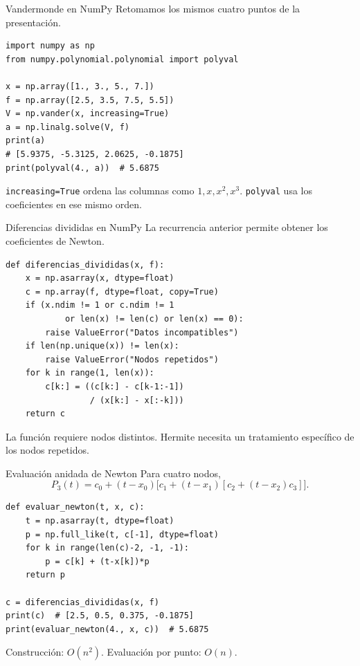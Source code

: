 \documentclass[aspectratio=169,12pt]{beamer}
\theoremstyle{remark}
\begin{document}
\begin{frame}[fragile]{Vandermonde en NumPy}
Retomamos los mismos cuatro puntos de la presentación.
\begin{lstlisting}
import numpy as np
from numpy.polynomial.polynomial import polyval

x = np.array([1., 3., 5., 7.])
f = np.array([2.5, 3.5, 7.5, 5.5])
V = np.vander(x, increasing=True)
a = np.linalg.solve(V, f)
print(a)
# [5.9375, -5.3125, 2.0625, -0.1875]
print(polyval(4., a))  # 5.6875
\end{lstlisting}
\texttt{increasing=True} ordena las columnas como $1,x,x^2,x^3$.
\texttt{polyval} usa los coeficientes en ese mismo orden.
\end{frame}

\begin{frame}[fragile]{Diferencias divididas en NumPy}
La recurrencia anterior permite obtener los coeficientes de Newton.
\begin{lstlisting}
def diferencias_divididas(x, f):
    x = np.asarray(x, dtype=float)
    c = np.array(f, dtype=float, copy=True)
    if (x.ndim != 1 or c.ndim != 1
            or len(x) != len(c) or len(x) == 0):
        raise ValueError("Datos incompatibles")
    if len(np.unique(x)) != len(x):
        raise ValueError("Nodos repetidos")
    for k in range(1, len(x)):
        c[k:] = ((c[k:] - c[k-1:-1])
                 / (x[k:] - x[:-k]))
    return c
\end{lstlisting}
La función requiere nodos distintos. Hermite necesita un tratamiento
específico de los nodos repetidos.
\end{frame}

\begin{frame}[fragile]{Evaluación anidada de Newton}
Para cuatro nodos,
\[
P_3(t)=c_0+(t-x_0)\bigl[c_1+(t-x_1)
                  [c_2+(t-x_2)c_3]\bigr].
\]
\begin{lstlisting}
def evaluar_newton(t, x, c):
    t = np.asarray(t, dtype=float)
    p = np.full_like(t, c[-1], dtype=float)
    for k in range(len(c)-2, -1, -1):
        p = c[k] + (t-x[k])*p
    return p

c = diferencias_divididas(x, f)
print(c)  # [2.5, 0.5, 0.375, -0.1875]
print(evaluar_newton(4., x, c))  # 5.6875
\end{lstlisting}
Construcción: $O(n^2)$. Evaluación por punto: $O(n)$.
\end{frame}
\end{document}
